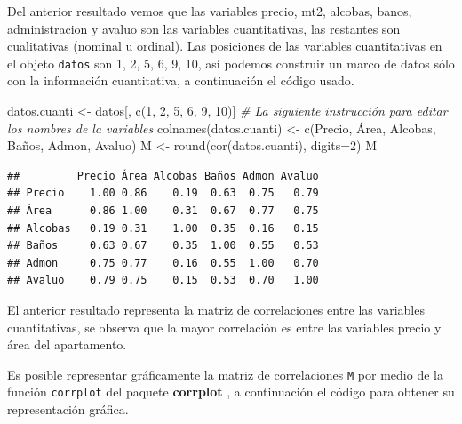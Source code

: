 \documentclass[
]{book}
\makeatletter
\newenvironment{Shaded}{\begin{snugshade}}{\end{snugshade}}
\newcommand{\AttributeTok}[1]{\textcolor[rgb]{0.77,0.63,0.00}{#1}}
\newcommand{\CommentTok}[1]{\textcolor[rgb]{0.56,0.35,0.01}{\textit{#1}}}
\newcommand{\DecValTok}[1]{\textcolor[rgb]{0.00,0.00,0.81}{#1}}
\newcommand{\FunctionTok}[1]{\textcolor[rgb]{0.00,0.00,0.00}{#1}}
\newcommand{\NormalTok}[1]{#1}
\newcommand{\OtherTok}[1]{\textcolor[rgb]{0.56,0.35,0.01}{#1}}
\newcommand{\StringTok}[1]{\textcolor[rgb]{0.31,0.60,0.02}{#1}}
\newenvironment{kframe}{%
\medskip{}
\setlength{\fboxsep}{.8em}
 \def\at@end@of@kframe{}%
 \ifinner\ifhmode%
  \def\at@end@of@kframe{\end{minipage}}%
  \begin{minipage}{\columnwidth}%
 \fi\fi%
 \def\FrameCommand##1{\hskip\@totalleftmargin \hskip-\fboxsep
 \colorbox{shadecolor}{##1}\hskip-\fboxsep
     \hskip-\linewidth \hskip-\@totalleftmargin \hskip\columnwidth}%
 \MakeFramed {\advance\hsize-\width
   \@totalleftmargin\z@ \linewidth\hsize
   \@setminipage}}%
 {\par\unskip\endMakeFramed%
 \at@end@of@kframe}
\renewenvironment{Shaded}{\begin{kframe}}{\end{kframe}}
\makeatother
\begin{document}
Del anterior resultado vemos que las variables precio, mt2, alcobas, banos, administracion y avaluo son las variables cuantitativas, las restantes son cualitativas (nominal u ordinal). Las posiciones de las variables cuantitativas en el objeto \texttt{datos} son 1, 2, 5, 6, 9, 10, así podemos construir un marco de datos sólo con la información cuantitativa, a continuación el código usado.

\begin{Shaded}
\begin{Highlighting}[]
\NormalTok{datos.cuanti }\OtherTok{\textless{}{-}}\NormalTok{ datos[, }\FunctionTok{c}\NormalTok{(}\DecValTok{1}\NormalTok{, }\DecValTok{2}\NormalTok{, }\DecValTok{5}\NormalTok{, }\DecValTok{6}\NormalTok{, }\DecValTok{9}\NormalTok{, }\DecValTok{10}\NormalTok{)]}
\CommentTok{\# La siguiente instrucción para editar los nombres de la variables}
\FunctionTok{colnames}\NormalTok{(datos.cuanti) }\OtherTok{\textless{}{-}} \FunctionTok{c}\NormalTok{(}\StringTok{\textquotesingle{}Precio\textquotesingle{}}\NormalTok{, }\StringTok{\textquotesingle{}Área\textquotesingle{}}\NormalTok{, }\StringTok{\textquotesingle{}Alcobas\textquotesingle{}}\NormalTok{,}
                            \StringTok{\textquotesingle{}Baños\textquotesingle{}}\NormalTok{, }\StringTok{\textquotesingle{}Admon\textquotesingle{}}\NormalTok{, }\StringTok{\textquotesingle{}Avaluo\textquotesingle{}}\NormalTok{)}
\NormalTok{M }\OtherTok{\textless{}{-}} \FunctionTok{round}\NormalTok{(}\FunctionTok{cor}\NormalTok{(datos.cuanti), }\AttributeTok{digits=}\DecValTok{2}\NormalTok{)}
\NormalTok{M}
\end{Highlighting}
\end{Shaded}

\begin{verbatim}
##         Precio Área Alcobas Baños Admon Avaluo
## Precio    1.00 0.86    0.19  0.63  0.75   0.79
## Área      0.86 1.00    0.31  0.67  0.77   0.75
## Alcobas   0.19 0.31    1.00  0.35  0.16   0.15
## Baños     0.63 0.67    0.35  1.00  0.55   0.53
## Admon     0.75 0.77    0.16  0.55  1.00   0.70
## Avaluo    0.79 0.75    0.15  0.53  0.70   1.00
\end{verbatim}

El anterior resultado representa la matriz de correlaciones entre las variables cuantitativas, se observa que la mayor correlación es entre las variables precio y área del apartamento.

Es posible representar gráficamente la matriz de correlaciones \texttt{M} por medio de la función \texttt{corrplot} del paquete \textbf{corrplot} \citep{R-corrplot}, a continuación el código para obtener su representación gráfica.
\end{document}
